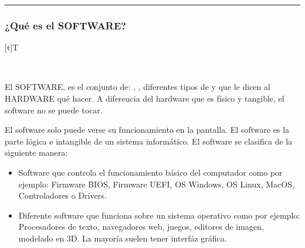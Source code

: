\documentclass[letterpaper,10pt,spanish]{sphinxmanual}
\let\sphinxpxdimen\pdfpxdimen\else\newdimen\sphinxpxdimen
\begin{document}
\bigskip\hrule\bigskip



\subsubsection{¿Qué es el SOFTWARE?}
\label{\detokenize{1_guias/8logica/G821:que-es-el-software}}

\begin{savenotes}\sphinxattablestart
\sphinxthistablewithglobalstyle
\centering
\begin{tabulary}{\linewidth}[t]{T}
\sphinxtoprule
\sphinxtableatstartofbodyhook

\begin{sphinxfigure-in-table}
\centering
\capstart
\noindent\sphinxincludegraphics[width=300\sphinxpxdimen]{{image0310}.png}
\label{\detokenize{1_guias/8logica/G821:id15}}\end{sphinxfigure-in-table}\relax
\\
\sphinxbottomrule
\end{tabulary}
\sphinxtableafterendhook\par
\sphinxattableend\end{savenotes}

\sphinxAtStartPar
\sphinxfootnotemark[1] El SOFTWARE, es el conjunto de: , , diferentes tipos de  y  que le dicen al HARDWARE qué hacer. A diferencia del hardware que es físico y tangible, el software no se puede tocar.

\sphinxAtStartPar
El software solo puede verse su funcionamiento en la pantalla. El software es la parte lógica e intangible de un sistema informático. El software se clasifica de la siguiente manera:
\begin{itemize}
\item {} 
\sphinxAtStartPar
{} Software que controla el funcionamiento básico del computador como por ejemplo: Firmware BIOS, Firmware UEFI, OS Windows, OS Linux, MacOS, Controladores o Drivers.

\item {} 
\sphinxAtStartPar
{} Diferente software que funciona sobre un sistema operativo como por ejemplo: Procesadores de texto, navegadores web, juegos, editores de imagen, modelado en 3D. La mayoría suelen tener interfáz gráfica.

\end{itemize}
\end{document}
